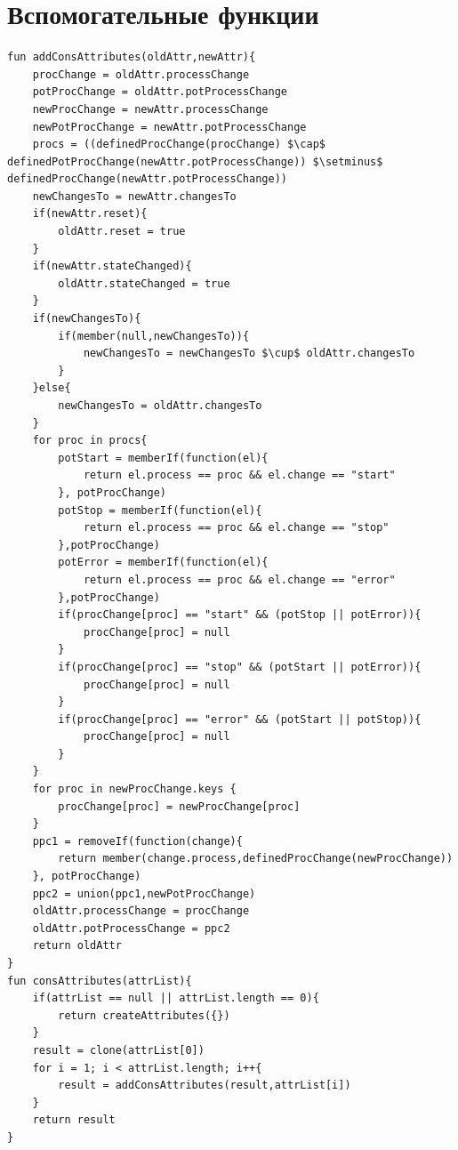 \section{Вспомогательные функции}
\begin{lstlisting}[style=PseudoStyle,mathescape=true]
fun addConsAttributes(oldAttr,newAttr){
    procChange = oldAttr.processChange
    potProcChange = oldAttr.potProcessChange
    newProcChange = newAttr.processChange
    newPotProcChange = newAttr.potProcessChange
    procs = ((definedProcChange(procChange) $\cap$ definedPotProcChange(newAttr.potProcessChange)) $\setminus$ definedProcChange(newAttr.potProcessChange))
    newChangesTo = newAttr.changesTo
    if(newAttr.reset){
        oldAttr.reset = true
    }
    if(newAttr.stateChanged){
        oldAttr.stateChanged = true
    }
    if(newChangesTo){
        if(member(null,newChangesTo)){
            newChangesTo = newChangesTo $\cup$ oldAttr.changesTo
        }
    }else{
        newChangesTo = oldAttr.changesTo
    }
    for proc in procs{
        potStart = memberIf(function(el){
            return el.process == proc && el.change == "start"
        }, potProcChange)
        potStop = memberIf(function(el){
            return el.process == proc && el.change == "stop"
        },potProcChange)
        potError = memberIf(function(el){
            return el.process == proc && el.change == "error"
        },potProcChange)
        if(procChange[proc] == "start" && (potStop || potError)){
            procChange[proc] = null
        }
        if(procChange[proc] == "stop" && (potStart || potError)){
            procChange[proc] = null
        }
        if(procChange[proc] == "error" && (potStart || potStop)){
            procChange[proc] = null
        }
    }
    for proc in newProcChange.keys {
        procChange[proc] = newProcChange[proc]
    }
    ppc1 = removeIf(function(change){
        return member(change.process,definedProcChange(newProcChange))
    }, potProcChange)
    ppc2 = union(ppc1,newPotProcChange)
    oldAttr.processChange = procChange
    oldAttr.potProcessChange = ppc2
    return oldAttr
}
fun consAttributes(attrList){
    if(attrList == null || attrList.length == 0){
        return createAttributes({})
    }
    result = clone(attrList[0])
    for i = 1; i < attrList.length; i++{
        result = addConsAttributes(result,attrList[i])
    }
    return result
}


\end{lstlisting}
